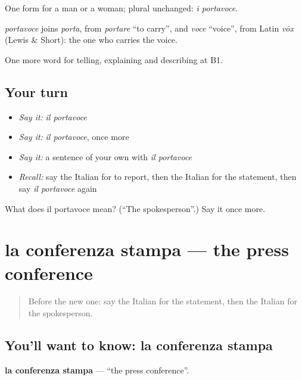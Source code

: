 One form for a man or a woman; plural unchanged: \emph{i portavoce}.

\begin{cousinweb}
\emph{portavoce} joins \emph{porta}, from \emph{portare} \textquotedblleft{}to carry\textquotedblright{}, and \emph{voce} \textquotedblleft{}voice\textquotedblright{}, from Latin \emph{vōx} (Lewis \& Short): the one who carries the voice.
\end{cousinweb}

\begin{grammarlens}[title={What you've built}]
One more word for telling, explaining and describing at B1.
\end{grammarlens}

\subsection*{Your turn}
\begin{itemize}
\raggedright
  \item \emph{Say it:} \emph{il portavoce}
  \item \emph{Say it:} \emph{il portavoce}, once more
  \item \emph{Say it:} a sentence of your own with \emph{il portavoce}
  \item \emph{Recall:} say the Italian for to report, then the Italian for the statement, then say \emph{il portavoce} again
\end{itemize}

\begin{tcolorbox}[breakable,colback=teal!4,colframe=teal!35!black,title={Before you move on}]
What does il portavoce mean? (\textquotedblleft{}The spokesperson\textquotedblright{}.) Say it once more.
\end{tcolorbox}
\section[la conferenza stampa]{la conferenza stampa — the press conference}

\label{lesson:IT-C285-conferenza-stampa}



\begin{quote}
Before the new one: say the Italian for the statement, then the Italian for the spokesperson.
\end{quote}

\subsection*{You'll want to know: la conferenza stampa}
\textbf{la conferenza stampa} — \textquotedblleft{}the press conference\textquotedblright{}.

